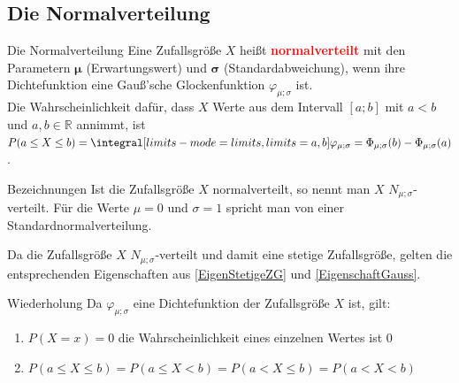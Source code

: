 \subsection{Die Normalverteilung}
\begin{defi}{Die Normalverteilung}{}\label{NormZG}
    Eine Zufallsgröße \(X\) heißt \textcolor{red}{\textbf{normalverteilt}} mit den Parametern \(\boldsymbol{\mu}\) (Erwartungswert) und \(\boldsymbol{\sigma}\) (Standardabweichung), wenn ihre Dichtefunktion eine Gauß'sche Glockenfunktion \(\varphi_{\mu;\sigma}\) ist. \\
    Die Wahrscheinlichkeit dafür, dass \(X\) Werte aus dem Intervall \([a;b]\) mit \(a<b\) und \(a,b \in \mathds{R}\) annimmt, ist \(P(a\leq X\leq b) = \integral[limits-mode=limits,limits={a, b}]{\varphi_{\mu;\sigma}} =\Phi_{\mu;\sigma} (b) - \Phi_{\mu;\sigma} (a)\).
\end{defi}
\begin{b8d}{Bezeichnungen}{}
Ist die Zufallsgröße \(X\) normalverteilt, so nennt man \(X\) \(N_{\mu;\sigma}\)-verteilt. Für die Werte \(\mu =0\) und \(\sigma = 1\) spricht man von einer Standardnormalverteilung.
\end{b8d}
Da die Zufallsgröße \(X\) \(N_{\mu;\sigma}\)-verteilt und damit eine stetige Zufallsgröße, gelten die entsprechenden Eigenschaften aus \ref{EigenStetigeZG} und  \ref{EigenschaftGauss}.
\begin{bem}{Wiederholung}{}
    Da \(\varphi_{\mu;\sigma}\) eine Dichtefunktion der Zufallsgröße \(X\) ist, gilt:
    \begin{enumerate}
        \item \(P(X=x)=0\) die Wahrscheinlichkeit eines einzelnen Wertes ist 0
        \item \(P(a\leq X\leq b) = P(a\leq X<b) = P(a<X\leq b) = P(a<X<b)\)
    \end{enumerate}
\end{bem}
